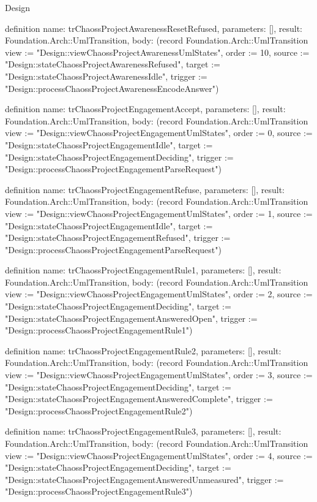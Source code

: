 \begin{lexlean}{Design}
\begin{semanticmodule}
definition{
  name: trChaossProjectAwarenessResetRefused,
  parameters: [],
  result: Foundation.Arch::UmlTransition,
  body: (record Foundation.Arch::UmlTransition {view := "Design::viewChaossProjectAwarenessUmlStates", order := 10, source := "Design::stateChaossProjectAwarenessRefused", target := "Design::stateChaossProjectAwarenessIdle", trigger := "Design::processChaossProjectAwarenessEncodeAnswer"})
}

definition{
  name: trChaossProjectEngagementAccept,
  parameters: [],
  result: Foundation.Arch::UmlTransition,
  body: (record Foundation.Arch::UmlTransition {view := "Design::viewChaossProjectEngagementUmlStates", order := 0, source := "Design::stateChaossProjectEngagementIdle", target := "Design::stateChaossProjectEngagementDeciding", trigger := "Design::processChaossProjectEngagementParseRequest"})
}

definition{
  name: trChaossProjectEngagementRefuse,
  parameters: [],
  result: Foundation.Arch::UmlTransition,
  body: (record Foundation.Arch::UmlTransition {view := "Design::viewChaossProjectEngagementUmlStates", order := 1, source := "Design::stateChaossProjectEngagementIdle", target := "Design::stateChaossProjectEngagementRefused", trigger := "Design::processChaossProjectEngagementParseRequest"})
}

definition{
  name: trChaossProjectEngagementRule1,
  parameters: [],
  result: Foundation.Arch::UmlTransition,
  body: (record Foundation.Arch::UmlTransition {view := "Design::viewChaossProjectEngagementUmlStates", order := 2, source := "Design::stateChaossProjectEngagementDeciding", target := "Design::stateChaossProjectEngagementAnsweredOpen", trigger := "Design::processChaossProjectEngagementRule1"})
}

definition{
  name: trChaossProjectEngagementRule2,
  parameters: [],
  result: Foundation.Arch::UmlTransition,
  body: (record Foundation.Arch::UmlTransition {view := "Design::viewChaossProjectEngagementUmlStates", order := 3, source := "Design::stateChaossProjectEngagementDeciding", target := "Design::stateChaossProjectEngagementAnsweredComplete", trigger := "Design::processChaossProjectEngagementRule2"})
}

definition{
  name: trChaossProjectEngagementRule3,
  parameters: [],
  result: Foundation.Arch::UmlTransition,
  body: (record Foundation.Arch::UmlTransition {view := "Design::viewChaossProjectEngagementUmlStates", order := 4, source := "Design::stateChaossProjectEngagementDeciding", target := "Design::stateChaossProjectEngagementAnsweredUnmeasured", trigger := "Design::processChaossProjectEngagementRule3"})
}


\end{semanticmodule}
\end{lexlean}
